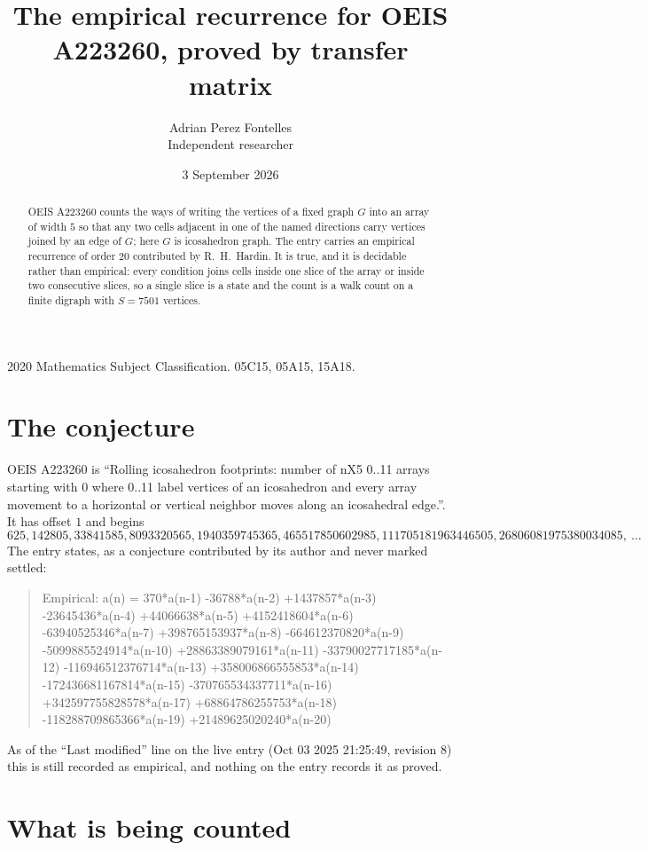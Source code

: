 \documentclass[11pt,a4paper]{article}
\title{The empirical recurrence for OEIS A223260, proved by transfer matrix}
\author{Adrian Perez Fontelles\\ \small Independent researcher}
\date{3 September 2026}
\theoremstyle{plain}
\theoremstyle{definition}
\begin{document}
\maketitle

\begin{abstract}
OEIS A223260 counts the ways of writing the vertices of a fixed graph $G$ into an array of width
$5$ so that any two cells adjacent in one of the named directions carry vertices joined by an
edge of $G$; here $G$ is icosahedron graph. The entry carries an empirical recurrence of order $20$
contributed by R.~H.~Hardin. It is true, and it is decidable rather than empirical: every
condition joins cells inside one slice of the array or inside two consecutive slices, so a
single slice is a state and the count is a walk count on a finite digraph with $S=7501$ vertices.
\end{abstract}

\noindent\small 2020 Mathematics Subject Classification. 05C15, 05A15, 15A18.\normalsize

\section{The conjecture}

OEIS A223260 is ``Rolling icosahedron footprints: number of nX5 0..11 arrays starting with 0 where 0..11 label vertices of an icosahedron and every array movement to a horizontal or vertical neighbor moves along an icosahedral edge.''. It has offset $1$ and begins
\[
625, 142805, 33841585, 8093320565, 1940359745365, 465517850602985, 111705181963446505, 26806081975380034085,\ \dots
\]
The entry states, as a conjecture contributed by its author and never marked settled:
\begin{quote}
Empirical: a(n) = 370*a(n-1) -36788*a(n-2) +1437857*a(n-3) -23645436*a(n-4) +44066638*a(n-5) +4152418604*a(n-6) -63940525346*a(n-7) +398765153937*a(n-8) -664612370820*a(n-9) -5099885524914*a(n-10) +28863389079161*a(n-11) -33790027717185*a(n-12) -116946512376714*a(n-13) +358006866555853*a(n-14) -172436681167814*a(n-15) -370765534337711*a(n-16) +342597755828578*a(n-17) +68864786255753*a(n-18) -118288709865366*a(n-19) +21489625020240*a(n-20)
\end{quote}
As of the ``Last modified'' line on the live entry (Oct 03 2025 21:25:49, revision 8) this is still
recorded as empirical, and nothing on the entry records it as proved.

\section{What is being counted}
\end{document}
